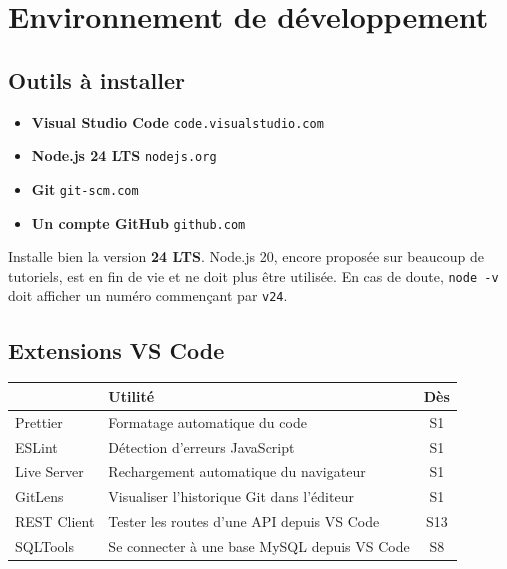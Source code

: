 \documentclass[a4paper,11pt]{article}
\newcommand{\hdr}[1]{\multicolumn{1}{l}{\color{white}\bfseries #1}}
\newcommand{\hdrc}[1]{\multicolumn{1}{c}{\color{white}\bfseries #1}}
\renewcommand{\arraystretch}{1.3}
\begin{document}
\section{Environnement de développement}

\subsection{Outils à installer}

\begin{tcolorbox}[definition, title={Liste des outils --- semaine 1}]
\begin{itemize}
  \item \textbf{Visual Studio Code} \hfill \texttt{code.visualstudio.com}
  \item \textbf{Node.js 24 LTS} \hfill \texttt{nodejs.org}
  \item \textbf{Git} \hfill \texttt{git-scm.com}
  \item \textbf{Un compte GitHub} \hfill \texttt{github.com}
\end{itemize}
\end{tcolorbox}

\begin{tcolorbox}[attention, title={Version de Node.js}]
Installe bien la version \textbf{24 LTS}. Node.js 20, encore proposée sur beaucoup de tutoriels, est en fin de vie et ne doit plus être utilisée. En cas de doute, \texttt{node -v} doit afficher un numéro commençant par \texttt{v24}.
\end{tcolorbox}

\subsection{Extensions VS Code}

\begin{center}
\renewcommand{\arraystretch}{1.0}
\begin{tabularx}{\linewidth}{p{4cm}Xc}
  \toprule
  \rowcolor{uniNavy}
  \hdr{Extension} &  \hdr{Utilité} &  \hdrc{Dès} \\
  \midrule
  \rowcolor{uniPaper}
  Prettier      & Formatage automatique du code & S1 \\
  ESLint        & Détection d'erreurs JavaScript & S1 \\
  \rowcolor{uniPaper}
  Live Server   & Rechargement automatique du navigateur & S1 \\
  GitLens       & Visualiser l'historique Git dans l'éditeur & S1 \\
  \rowcolor{uniPaper}
  REST Client   & Tester les routes d'une API depuis VS Code & S13 \\
  SQLTools      & Se connecter à une base MySQL depuis VS Code & S8 \\
  \bottomrule
\end{tabularx}
\end{center}
\end{document}
